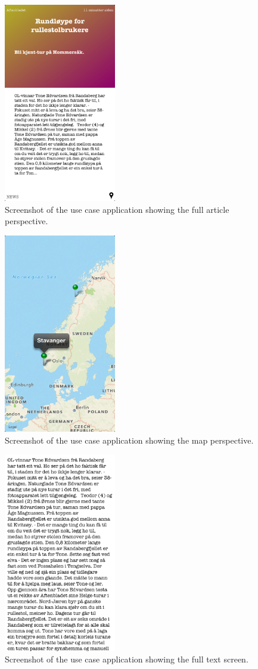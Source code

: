 \begin{figure}[!htbp]
\centering
\includegraphics[width=49mm]{GFX/usecase/article.png}
\caption{Screenshot of the use case application showing the full article perspective.}
\label{usecase_article}
\end{figure}

\begin{figure}[!htbp]
\centering
\includegraphics[width=49mm]{GFX/usecase/map.png}
\caption{Screenshot of the use case application showing the map perspective.}
\label{usecase_map}
\end{figure}

\begin{figure}[!htbp]
\centering
\includegraphics[width=49mm]{GFX/usecase/text.png}
\caption{Screenshot of the use case application showing the full text screen.}
\label{usecase_text}
\end{figure}

